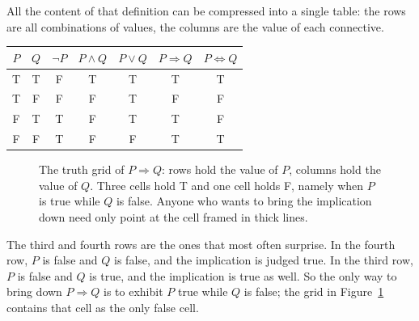 All the content of that definition can be compressed into a single table: the rows are all combinations
of values, the columns are the value of each connective.

{\centering
\begin{tabular}{cc|ccccc}
\hline
$P$ & $Q$ & $\neg P$ & $P \wedge Q$ & $P \vee Q$ & $P \Rightarrow Q$ & $P \Leftrightarrow Q$ \\
\hline
T & T & F & T & T & T & T \\
T & F & F & F & T & F & F \\
F & T & T & F & T & T & F \\
F & F & T & F & F & T & T \\
\hline
\end{tabular}\par}

\begin{figure}[htbp]
\centering
{}
\caption{The truth grid of $P \Rightarrow Q$: rows hold the value of $P$, columns hold the value of $Q$.
Three cells hold T and one cell holds F, namely when $P$ is true while $Q$ is false.
Anyone who wants to bring the implication down need only point at the cell framed in thick lines.}
\label{fig:kisi-implikasi}
\end{figure}

The third and fourth rows are the ones that most often surprise. In the fourth row,
$P$ is false and $Q$ is false, and the implication is judged true. In the third row, $P$ is false
and $Q$ is true, and the implication is true as well. So the only way to bring down
$P \Rightarrow Q$ is to exhibit $P$ true while $Q$ is false; the grid in
Figure~\ref{fig:kisi-implikasi} contains that cell as the only false cell.

